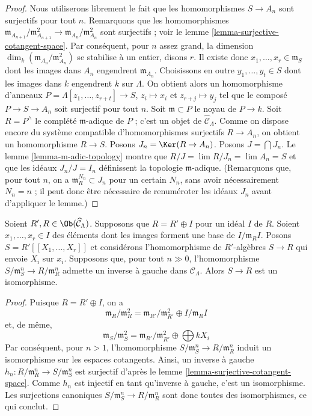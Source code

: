 \begin{proof}
Nous utiliserons librement le fait que les homomorphismes $S \to A_n$ sont
surjectifs pour tout $n$. Remarquons que les homomorphismes
$\mathfrak m_{A_{n + 1}}/\mathfrak m_{A_{n + 1}}^2 \to
\mathfrak m_{A_n}/\mathfrak m_{A_n}^2$ sont surjectifs ; voir le lemme
\ref{lemma-surjective-cotangent-space}. Par conséquent, pour $n$ assez grand,
la dimension $\dim_k (\mathfrak m_{A_n}/\mathfrak m_{A_n}^2)$ se stabilise à
un entier, disons $r$. Il existe donc
$x_1, \ldots, x_r \in \mathfrak m_S$ dont les images dans $A_n$ engendrent
$\mathfrak m_{A_n}$. Choisissons en outre $y_1, \ldots, y_t \in S$ dont les
images dans $k$ engendrent $k$ sur $\Lambda$. On obtient alors un homomorphisme
d'anneaux
$P = \Lambda[z_1, \ldots, z_{r + t}] \to S$, $z_i \mapsto x_i$ et
$z_{r + j} \mapsto y_j$ tel que le composé $P \to S \to A_n$ soit surjectif
pour tout $n$. Soit $\mathfrak m \subset P$ le noyau de $P \to k$.
Soit $R = P^\wedge$ le complété $\mathfrak m$-adique de $P$ ; c'est un objet
de $\widehat{\mathcal{C}}_\Lambda$. Comme on dispose encore du système
compatible d'homomorphismes surjectifs $R \to A_n$, on obtient un
homomorphisme $R \to S$. Posons $J_n = \Ker(R \to A_n)$.
Posons $J = \bigcap J_n$. Le lemme \ref{lemma-m-adic-topology} montre que
$R/J = \lim R/J_n = \lim A_n = S$ et que les idéaux $J_n/J = I_n$ définissent
la topologie $\mathfrak m$-adique. (Remarquons que, pour tout $n$, on a
$\mathfrak m_R^{N_n} \subset J_n$ pour un certain $N_n$, sans avoir
nécessairement $N_n = n$ ; il peut donc être nécessaire de renuméroter les
idéaux $J_n$ avant d'appliquer le lemme.)
\end{proof}

\begin{lemma}
\label{lemma-power-series}
Soient $R', R \in \Ob(\widehat{\mathcal{C}}_\Lambda)$. Supposons que
$R = R' \oplus I$ pour un idéal $I$ de $R$. Soient
$x_1, \ldots, x_r \in I$ des éléments dont les images forment une base de
$I/\mathfrak m_R I$. Posons $S = R'[[X_1, \ldots, X_r]]$ et considérons
l'homomorphisme de $R'$-algèbres $S \to R$ qui envoie $X_i$ sur $x_i$.
Supposons que, pour tout $n \gg 0$, l'homomorphisme
$S/\mathfrak m_S^n \to R/\mathfrak m_R^n$ admette un inverse à gauche dans
$\mathcal{C}_\Lambda$. Alors $S \to R$ est un isomorphisme.
\end{lemma}

\begin{proof}
Puisque $R = R' \oplus I$, on a
$$
\mathfrak m_R/\mathfrak m_R^2 =
\mathfrak m_{R'}/\mathfrak m_{R'}^2 \oplus I/\mathfrak m_RI
$$
et, de même,
$$
\mathfrak m_S/\mathfrak m_S^2 =
\mathfrak m_{R'}/\mathfrak m_{R'}^2 \oplus \bigoplus kX_i
$$
Par conséquent, pour $n > 1$, l'homomorphisme
$S/\mathfrak m_S^n \to R/\mathfrak m_R^n$ induit un isomorphisme sur les
espaces cotangents. Ainsi, un inverse à gauche
$h_n : R/\mathfrak m_R^n \to S/\mathfrak m_S^n$ est surjectif d'après le
lemme \ref{lemma-surjective-cotangent-space}. Comme $h_n$ est injectif en tant
qu'inverse à gauche, c'est un isomorphisme. Les surjections canoniques
$S/\mathfrak m_S^n \to R/\mathfrak m_R^n$ sont donc toutes des isomorphismes,
ce qui conclut.
\end{proof}




